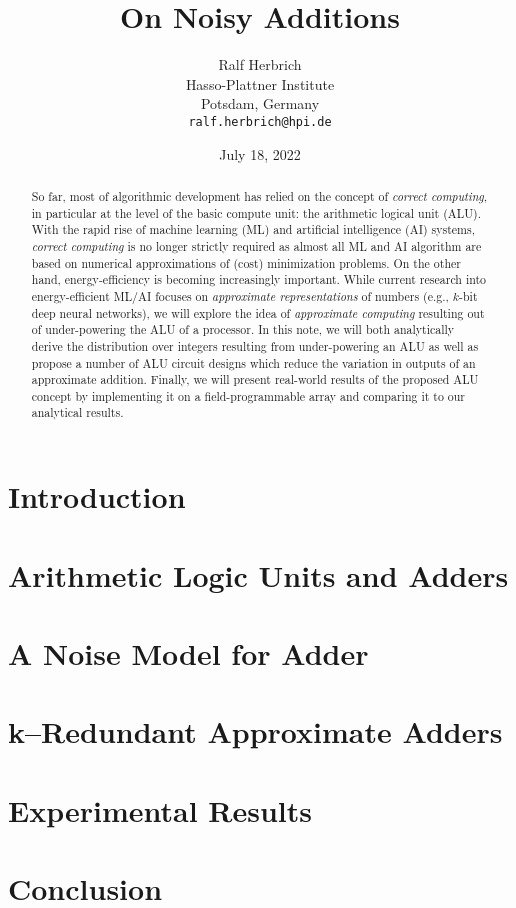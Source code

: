 \documentclass{article}
\title{On Noisy Additions}
\date{July 18, 2022}		%
\author{Ralf Herbrich \\
	Hasso-Plattner Institute\\
	Potsdam, Germany \\
	\texttt{ralf.herbrich@hpi.de} \\
}
\newcommand{\0}{\boldsymbol{0}}
\newcommand{\1}{\boldsymbol{1}}
\begin{document}
\maketitle

\begin{abstract}
	So far, most of algorithmic development has relied on the concept of {\em correct computing}, in particular at the level of the basic compute unit: the arithmetic logical unit (ALU). With the rapid rise of machine learning (ML) and artificial intelligence (AI) systems, {\em correct computing} is no longer strictly required as almost all ML and AI algorithm are based on numerical approximations of (cost) minimization problems. On the other hand, energy-efficiency is becoming increasingly important. While current research into energy-efficient ML/AI focuses on {\em approximate representations} of numbers (e.g., $k$-bit deep neural networks), we will explore the idea of {\em approximate computing} resulting out of under-powering the ALU of a processor. In this note, we will both analytically derive the distribution over integers resulting from under-powering an ALU as well as propose a number of ALU circuit designs which reduce the variation in outputs of an approximate addition. Finally, we will present real-world results of the proposed ALU concept by implementing it on a field-programmable array and comparing it to our analytical results.
\end{abstract}




\section{Introduction}


\section{Arithmetic Logic Units and Adders}


\section{A Noise Model for Adder}


\section{k--Redundant Approximate Adders}


\section{Experimental Results}

\section{Conclusion}


 
\end{document}
